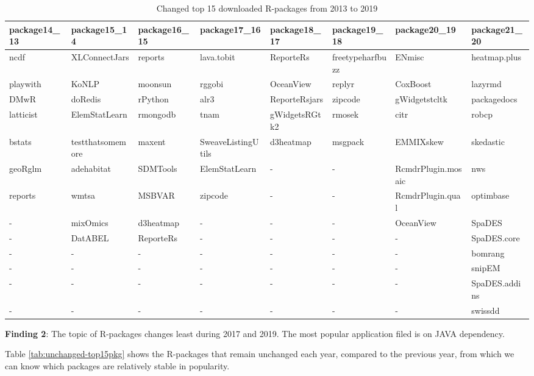 \documentclass[
]{book}
\newenvironment{discovery}[1]{%
  \begin{tcolorbox}[colback=blue!30,colframe=blue!80!black]#1}{\end{tcolorbox}}
\begin{document}
\begin{table}

\caption{\label{tab:changed-top15pkg}Changed top 15 downloaded R-packages from 2013 to 2019}
\centering
\begin{tabular}[t]{l|l|l|l|l|l|l|l}
\hline
package14\_13 & package15\_14 & package16\_15 & package17\_16 & package18\_17 & package19\_18 & package20\_19 & package21\_20\\
\hline
ncdf & XLConnectJars & reports & lava.tobit & ReporteRs & freetypeharfbuzz & ENmisc & heatmap.plus\\
\hline
playwith & KoNLP & moonsun & rggobi & OceanView & replyr & CoxBoost & lazyrmd\\
\hline
DMwR & doRedis & rPython & alr3 & ReporteRsjars & zipcode & gWidgetstcltk & packagedocs\\
\hline
latticist & ElemStatLearn & rmongodb & tnam & gWidgetsRGtk2 & rmosek & citr & robcp\\
\hline
bstats & testthatsomemore & maxent & SweaveListingUtils & d3heatmap & msgpack & EMMIXskew & skedastic\\
\hline
geoRglm & adehabitat & SDMTools & ElemStatLearn & - & - & RcmdrPlugin.mosaic & nws\\
\hline
reports & wmtsa & MSBVAR & zipcode & - & - & RcmdrPlugin.qual & optimbase\\
\hline
- & mixOmics & d3heatmap & - & - & - & OceanView & SpaDES\\
\hline
- & DatABEL & ReporteRs & - & - & - & - & SpaDES.core\\
\hline
- & - & - & - & - & - & - & bomrang\\
\hline
- & - & - & - & - & - & - & snipEM\\
\hline
- & - & - & - & - & - & - & SpaDES.addins\\
\hline
- & - & - & - & - & - & - & swissdd\\
\hline
\end{tabular}
\end{table}

\begin{discovery}
\textbf{Finding 2}: The topic of R-packages changes least during 2017
and 2019. The most popular application filed is on JAVA dependency.
\end{discovery}

Table \ref{tab:unchanged-top15pkg} shows the R-packages that remain unchanged each year, compared to the previous year, from which we can know which packages are relatively stable in popularity.
\end{document}
